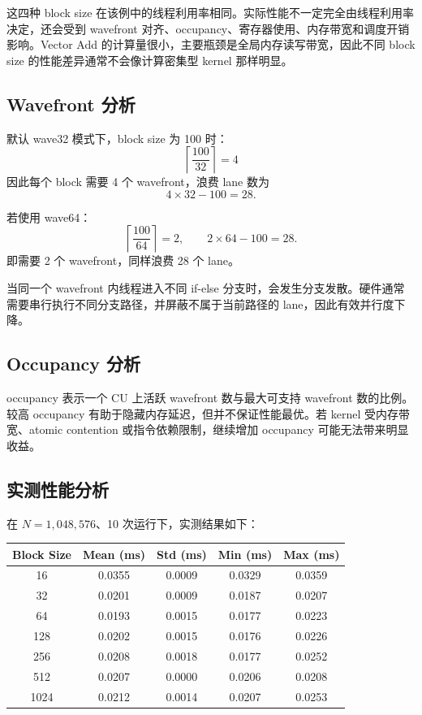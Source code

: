 \documentclass[UTF8,a4paper,12pt,fontset=none]{ctexart}
\begin{document}
这四种 block size 在该例中的线程利用率相同。实际性能不一定完全由线程利用率决定，还会受到 wavefront 对齐、occupancy、寄存器使用、内存带宽和调度开销影响。Vector Add 的计算量很小，主要瓶颈是全局内存读写带宽，因此不同 block size 的性能差异通常不会像计算密集型 kernel 那样明显。

\subsection{Wavefront 分析}

默认 wave32 模式下，block size 为 100 时：
\[
  \left\lceil\frac{100}{32}\right\rceil=4
\]
因此每个 block 需要 4 个 wavefront，浪费 lane 数为
\[
  4\times 32-100=28.
\]

若使用 wave64：
\[
  \left\lceil\frac{100}{64}\right\rceil=2,
  \qquad 2\times 64-100=28.
\]
即需要 2 个 wavefront，同样浪费 28 个 lane。

当同一个 wavefront 内线程进入不同 if-else 分支时，会发生分支发散。硬件通常需要串行执行不同分支路径，并屏蔽不属于当前路径的 lane，因此有效并行度下降。

\subsection{Occupancy 分析}

occupancy 表示一个 CU 上活跃 wavefront 数与最大可支持 wavefront 数的比例。较高 occupancy 有助于隐藏内存延迟，但并不保证性能最优。若 kernel 受内存带宽、atomic contention 或指令依赖限制，继续增加 occupancy 可能无法带来明显收益。

\subsection{实测性能分析}

在 $N=1,048,576$、10 次运行下，实测结果如下：

\begin{center}
\begin{tabular}{ccccc}
\toprule
Block Size & Mean (ms) & Std (ms) & Min (ms) & Max (ms) \\
\midrule
16   & 0.0355 & 0.0009 & 0.0329 & 0.0359 \\
32   & 0.0201 & 0.0009 & 0.0187 & 0.0207 \\
64   & 0.0193 & 0.0015 & 0.0177 & 0.0223 \\
128  & 0.0202 & 0.0015 & 0.0176 & 0.0226 \\
256  & 0.0208 & 0.0018 & 0.0177 & 0.0252 \\
512  & 0.0207 & 0.0000 & 0.0206 & 0.0208 \\
1024 & 0.0212 & 0.0014 & 0.0207 & 0.0253 \\
\bottomrule
\end{tabular}
\end{center}
\end{document}
